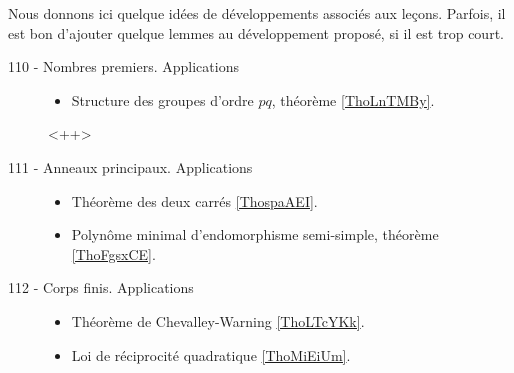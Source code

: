 Nous donnons ici quelque idées de développements associés aux leçons. Parfois, il est bon d'ajouter quelque lemmes au développement proposé, si il est trop court.

\begin{description}
    \item[110 - Nombres premiers. Applications]
        \begin{itemize}
            \item Structure des groupes d'ordre \( pq\), théorème \ref{ThoLnTMBy}.
        \end{itemize}
        <++>

    \item[111 - Anneaux principaux. Applications]
        \begin{itemize}
            \item Théorème des deux carrés \ref{ThospaAEI}.
            \item Polynôme minimal d'endomorphisme semi-simple, théorème \ref{ThoFgsxCE}.
        \end{itemize}

    \item[112 - Corps finis. Applications]
        \begin{itemize}
            \item Théorème de Chevalley-Warning \ref{ThoLTcYKk}.
            \item Loi de réciprocité quadratique \ref{ThoMiEiUm}.
        \end{itemize}
\end{description}
